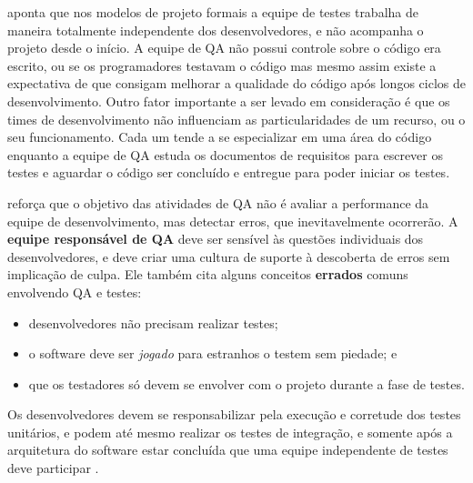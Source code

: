 \documentclass[
	12pt,				%
	openright,			%
	oneside,			%
	a4paper,			%
	english,			%
	brazil,				%
	]{abntex2}
\begin{document}


 aponta que nos modelos de projeto formais a equipe de testes trabalha de maneira totalmente independente dos desenvolvedores, e não acompanha o projeto desde o início. A equipe de QA não possui controle sobre o código era escrito, ou se os programadores testavam o código mas mesmo assim existe a expectativa de que consigam melhorar a qualidade do código após longos ciclos de desenvolvimento. Outro fator importante a ser levado em consideração é que os times de desenvolvimento não influenciam as particularidades de um recurso, ou o seu funcionamento. Cada um tende a se especializar em uma área do código enquanto a equipe de QA estuda os documentos de requisitos para escrever os testes e aguardar o código ser concluído e entregue para poder iniciar os testes.

 reforça que o objetivo das atividades de QA não é avaliar a performance da equipe de desenvolvimento, mas detectar erros, que inevitavelmente ocorrerão. A \textbf{equipe responsável de QA} deve ser sensível às questões individuais dos desenvolvedores, e deve criar uma cultura de suporte à descoberta de erros sem implicação de culpa. Ele também cita alguns conceitos \textbf{errados} comuns envolvendo QA e testes:

\begin{itemize}
    \item desenvolvedores não precisam realizar testes;
    \item o software deve ser \emph{jogado} para estranhos o testem sem piedade; e
    \item que os testadores só devem se envolver com o projeto durante a fase de testes.
\end{itemize}

Os desenvolvedores devem se responsabilizar pela execução e corretude dos testes unitários, e podem até mesmo realizar os testes de integração, e somente após a arquitetura do software estar concluída que uma equipe independente de testes deve participar \cite{SOMMERVILLE2011}.
\end{document}
